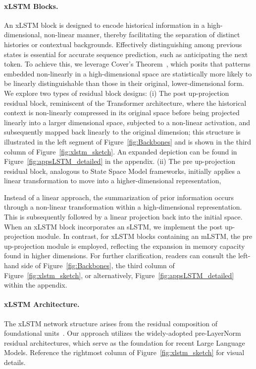 \paragraph{xLSTM Blocks.}
\label{sec:xLSTMblock}
An xLSTM block is designed to encode historical information in a high-dimensional, non-linear manner, thereby facilitating the separation of distinct histories or contextual backgrounds. Effectively distinguishing among previous states is essential for accurate sequence prediction, such as anticipating the next token. To achieve this, we leverage Cover’s Theorem~\citep{Cover:65}, which posits that patterns embedded non-linearly in a high-dimensional space are statistically more likely to be linearly distinguishable than those in their original, lower-dimensional form. We explore two types of residual block designs: (i) The post up-projection residual block, reminiscent of the Transformer architecture, where the historical context is non-linearly compressed in its original space before being projected linearly into a larger dimensional space, subjected to a non-linear activation, and subsequently mapped back linearly to the original dimension; this structure is illustrated in the left segment of Figure~\ref{fig:Backbones} and is shown in the third column of Figure~\ref{fig:xlstm_sketch}. An expanded depiction can be found in Figure~\ref{fig:appsLSTM_detailed} in the appendix. (ii) The pre up-projection residual block, analogous to State Space Model frameworks, initially applies a linear transformation to move into a higher-dimensional representation,

Instead of a linear approach, the summarization of prior information occurs through a non-linear transformation within a high-dimensional representation. This is subsequently followed by a linear projection back into the initial space. When an xLSTM block incorporates an sLSTM, we implement the post up-projection module. In contrast, for xLSTM blocks containing an mLSTM, the pre up-projection module is employed, reflecting the expansion in memory capacity found in higher dimensions. For further clarification, readers can consult the left-hand side of Figure~\ref{fig:Backbones}, the third column of Figure~\ref{fig:xlstm_sketch}, or alternatively, Figure~\ref{fig:appsLSTM_detailed} within the appendix.

\paragraph{xLSTM Architecture. }
\label{sec:xLSTMarchitecure}
The xLSTM network structure arises from the residual composition of foundational units~\citep{Srivastava:15,He:16}. Our approach utilizes the widely-adopted pre-LayerNorm~\citep{Ba:16b} residual architectures, which serve as the foundation for recent Large Language Models. Reference the rightmost column of Figure~\ref{fig:xlstm_sketch} for visual details.

